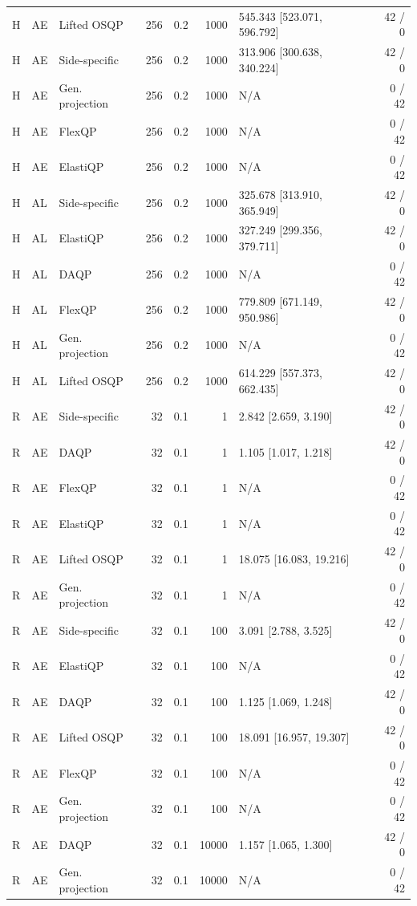 \begin{longtable}{@{}lllrrrlr@{}}
H & AE & Lifted OSQP & 256 & 0.2 & 1000 & 545.343 [523.071, 596.792] & 42 / 0 \\
H & AE & Side-specific & 256 & 0.2 & 1000 & 313.906 [300.638, 340.224] & 42 / 0 \\
H & AE & Gen. projection & 256 & 0.2 & 1000 & N/A & 0 / 42 \\
H & AE & FlexQP & 256 & 0.2 & 1000 & N/A & 0 / 42 \\
H & AE & ElastiQP & 256 & 0.2 & 1000 & N/A & 0 / 42 \\
H & AL & Side-specific & 256 & 0.2 & 1000 & 325.678 [313.910, 365.949] & 42 / 0 \\
H & AL & ElastiQP & 256 & 0.2 & 1000 & 327.249 [299.356, 379.711] & 42 / 0 \\
H & AL & DAQP & 256 & 0.2 & 1000 & N/A & 0 / 42 \\
H & AL & FlexQP & 256 & 0.2 & 1000 & 779.809 [671.149, 950.986] & 42 / 0 \\
H & AL & Gen. projection & 256 & 0.2 & 1000 & N/A & 0 / 42 \\
H & AL & Lifted OSQP & 256 & 0.2 & 1000 & 614.229 [557.373, 662.435] & 42 / 0 \\
R & AE & Side-specific & 32 & 0.1 & 1 & 2.842 [2.659, 3.190] & 42 / 0 \\
R & AE & DAQP & 32 & 0.1 & 1 & 1.105 [1.017, 1.218] & 42 / 0 \\
R & AE & FlexQP & 32 & 0.1 & 1 & N/A & 0 / 42 \\
R & AE & ElastiQP & 32 & 0.1 & 1 & N/A & 0 / 42 \\
R & AE & Lifted OSQP & 32 & 0.1 & 1 & 18.075 [16.083, 19.216] & 42 / 0 \\
R & AE & Gen. projection & 32 & 0.1 & 1 & N/A & 0 / 42 \\
R & AE & Side-specific & 32 & 0.1 & 100 & 3.091 [2.788, 3.525] & 42 / 0 \\
R & AE & ElastiQP & 32 & 0.1 & 100 & N/A & 0 / 42 \\
R & AE & DAQP & 32 & 0.1 & 100 & 1.125 [1.069, 1.248] & 42 / 0 \\
R & AE & Lifted OSQP & 32 & 0.1 & 100 & 18.091 [16.957, 19.307] & 42 / 0 \\
R & AE & FlexQP & 32 & 0.1 & 100 & N/A & 0 / 42 \\
R & AE & Gen. projection & 32 & 0.1 & 100 & N/A & 0 / 42 \\
R & AE & DAQP & 32 & 0.1 & 10000 & 1.157 [1.065, 1.300] & 42 / 0 \\
R & AE & Gen. projection & 32 & 0.1 & 10000 & N/A & 0 / 42 \\

\end{longtable}

